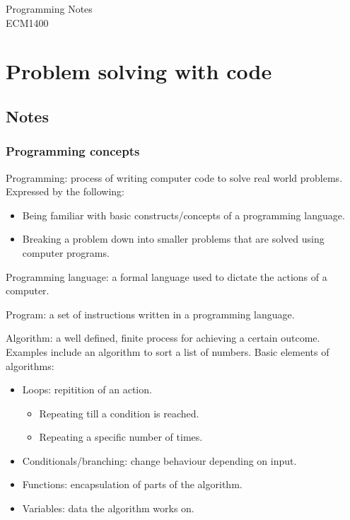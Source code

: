 \documentclass[a4paper]{report}
\begin{document}
\begin{titlepage}
	\raggedleft
	\vspace*{2cm}
	\Huge{Programming Notes}\\
	\vspace{0.5cm}
	\large{ECM1400}
\end{titlepage}

\tableofcontents

\chapter{Problem solving with code}

\section{Notes}

\subsection{Programming concepts}

Programming: process of writing computer code to solve real world problems.
Expressed by the following:

\begin{itemize}
	\item{Being familiar with basic constructs/concepts of a programming
		language.}
	\item{Breaking a problem down into smaller problems that are solved
		using computer programs.}
\end{itemize}

Programming language: a formal language used to dictate the actions of a
computer.

Program: a set of instructions written in a programming language.

Algorithm: a well defined, finite process for achieving a certain outcome.
Examples include an algorithm to sort a list of numbers. Basic elements of
algorithms:

\begin{itemize}
	\item{Loops: repitition of an action.}
		\begin{itemize}
			\item{Repeating till a condition is reached.}
			\item{Repeating a specific number of times.}
		\end{itemize}
	\item{Conditionals/branching: change behaviour depending on input.}
	\item{Functions: encapsulation of parts of the algorithm.}
	\item{Variables: data the algorithm works on.}
\end{itemize}
\end{document}
